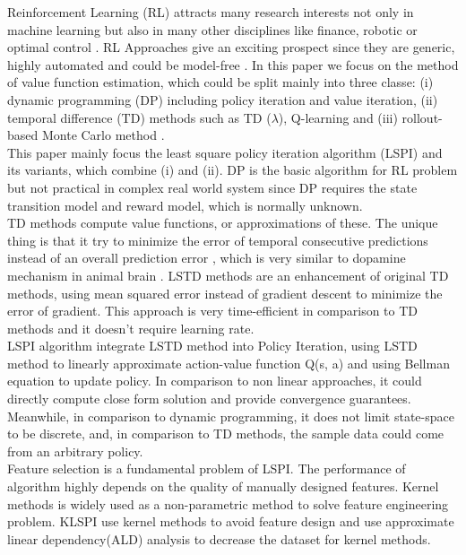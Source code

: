 Reinforcement Learning (RL) attracts many research interests not only in machine learning but also in many other disciplines like finance, robotic or optimal control \cite{kaelbling1996reinforcement}. RL Approaches give an exciting prospect since they are generic, highly automated and could be model-free \cite{rajeswaran2017towards}. 
In this paper we focus on the method of value function estimation, which could be split mainly into three classe: (i) dynamic programming (DP) including policy iteration and value iteration, (ii) temporal difference (TD) methods such as TD ($\lambda$), Q-learning and (iii)  rollout-based Monte Carlo method \cite{kober2013reinforcement}.\\
This paper mainly focus the least square policy iteration algorithm (LSPI) and its variants, which combine (i) and (ii). DP is the basic algorithm for RL problem but not practical in complex real world system since DP requires the state transition model and reward model, which is normally unknown. 
\\
TD methods compute value functions, or approximations of these. The unique thing is that it try to minimize the error of temporal  consecutive predictions instead of an overall
prediction error \cite{kunz2000introduction}, which is very similar to dopamine mechanism in animal brain \cite{glimcher2011understanding}. LSTD methods are an enhancement of original TD methods, using mean squared error instead of gradient descent to minimize the error of gradient. This approach is very time-efficient in comparison to TD methods and it doesn't require learning rate.
\\
LSPI algorithm integrate LSTD method into Policy Iteration, using LSTD method to linearly approximate  action-value function Q(s, a) and using Bellman equation to update policy. In comparison to non linear approaches, it could directly compute close form solution and provide convergence guarantees. Meanwhile, in comparison to dynamic programming, it does not limit state-space to be discrete, and, in comparison to TD methods, the sample data could come from an arbitrary policy. \\
Feature selection is a fundamental problem of LSPI. The performance of algorithm highly depends on the quality of manually designed features. Kernel methods is widely used as a non-parametric method to solve feature engineering problem. KLSPI use kernel methods to avoid feature design and use approximate linear dependency(ALD) analysis to decrease the dataset for kernel methods.

